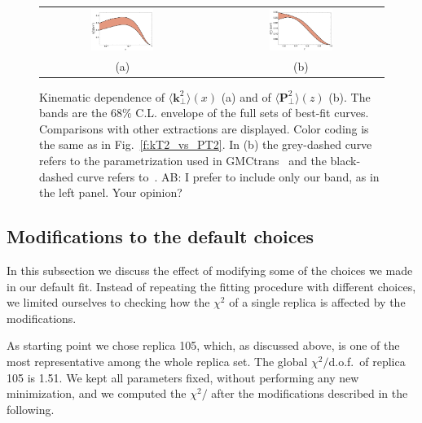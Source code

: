 \documentclass[aps,preprintnumbers,showpacs,nofootinbib,superscriptaddress,floatfix]{revtex4}
\newcommand{\AS}[1]{{\textcolor[rgb]{1,0,1}{#1}}}
\newcommand{\T}{\perp}
\begin{document}
\begin{figure}[h!]
\centering
\begin{tabular}{ccc}
\includegraphics[width=0.40\textwidth]{plots/kT2av_compare.pdf}
&\hspace{0.001cm}
&
\includegraphics[width=0.40\textwidth]{plots/PT2av_compare.pdf}
\\
(a) && (b)
\end{tabular}
\caption{Kinematic dependence of $\big \langle \bm{k}_{\T}^2 \big \rangle (x)$
  (a) and of $\big \langle \bm{P}_{\perp}^2 \big \rangle (z)$ (b). The bands
  are the $68\%$ C.L. envelope of the full sets of best-fit
  curves. Comparisons with other extractions are displayed. Color coding is
  the same as in Fig.~\ref{f:kT2_vs_PT2}.  In (b) the grey-dashed curve refers
  to the parametrization used in GMCtrans~\cite{gmctrans} and the black-dashed
  curve refers to~\cite{Boglione:1999pz}. \AS{AB: I prefer to include only our
  band, as in the left panel. Your opinion?}}
\label{f:avmomenta_68CL}
\end{figure}


\subsection{Modifications to the default choices}
\label{ss:replica105}


In this subsection we discuss the effect of modifying some of the choices we
made in our default fit. Instead of repeating the fitting procedure with
different choices, we limited ourselves to checking how the $\chi^2$ of a single
replica is affected by the modifications. 

As starting point we chose replica
105, which, as discussed above, is one of the most representative among the
whole replica set. 
The global $\chi^2/$d.o.f.\ of replica 105 is 1.51. We kept all parameters
fixed, without performing any new minimization, 
and we computed the $\chi^2/$ after the modifications described in the
following.
\end{document}
